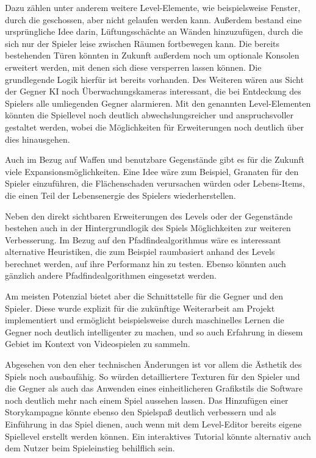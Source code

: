 Dazu zählen unter anderem weitere Level-Elemente, wie beispielsweise Fenster, durch die geschossen, aber nicht gelaufen werden kann. Außerdem bestand eine ursprüngliche Idee darin, Lüftungsschächte an Wänden hinzuzufügen, durch die sich nur der Spieler leise zwischen Räumen fortbewegen kann. Die bereits bestehenden Türen könnten in Zukunft außerdem noch um optionale Konsolen erweitert werden, mit denen sich diese versperren lassen können. Die grundlegende Logik hierfür ist bereits vorhanden. Des Weiteren wären aus Sicht der Gegner KI noch Überwachungskameras interessant, die bei Entdeckung des Spielers alle umliegenden Gegner alarmieren. Mit den genannten Level-Elementen könnten die Spiellevel noch deutlich abwechslungsreicher und anspruchsvoller gestaltet werden, wobei die Möglichkeiten für Erweiterungen noch deutlich über dies hinausgehen.

Auch im Bezug auf Waffen und benutzbare Gegenstände gibt es für die Zukunft viele Expansionsmöglichkeiten. Eine Idee wäre zum Beispiel, Granaten für den Spieler einzuführen, die Flächenschaden verursachen würden oder Lebens-Items, die einen Teil der Lebensenergie des Spielers wiederherstellen.

Neben den direkt sichtbaren Erweiterungen des Levels oder der Gegenstände bestehen auch in der Hintergrundlogik des Spiels Möglichkeiten zur weiteren Verbesserung. Im Bezug auf den Pfadfindealgorithmus wäre es interessant alternative Heuristiken, die zum Beispiel raumbasiert anhand des Levels berechnet werden, auf ihre Performanz hin zu testen. Ebenso könnten auch gänzlich andere Pfadfindealgorithmen eingesetzt werden.

Am meisten Potenzial bietet aber die Schnittstelle für die Gegner und den Spieler. Diese wurde explizit für die zukünftige Weiterarbeit am Projekt implementiert und ermöglicht beispielsweise durch maschinelles Lernen die Gegner noch deutlich intelligenter zu machen, und so auch Erfahrung in diesem Gebiet im Kontext von Videospielen zu sammeln.

Abgesehen von den eher technischen Änderungen ist vor allem die Ästhetik des Spiels noch ausbaufähig. So würden detailliertere Texturen für den Spieler und die Gegner als auch das Anwenden eines einheitlicheren Grafikstils die Software noch deutlich mehr nach einem Spiel aussehen lassen. Das Hinzufügen einer Storykampagne könnte ebenso den Spielspaß deutlich verbessern und als Einführung in das Spiel dienen, auch wenn mit dem Level-Editor bereits eigene Spiellevel erstellt werden können. Ein interaktives Tutorial könnte alternativ auch dem Nutzer beim Spieleinstieg behilflich sein.


